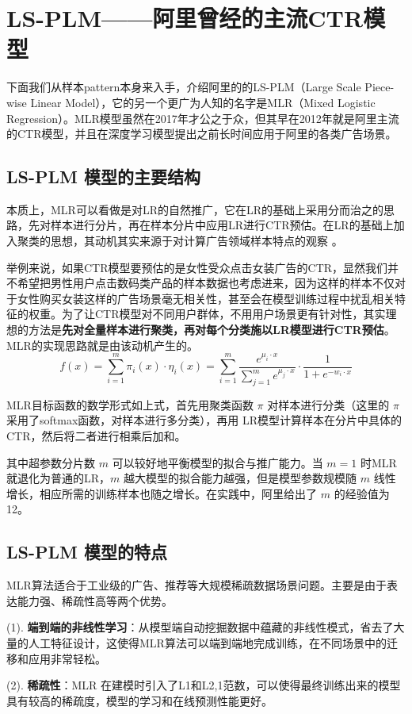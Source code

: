 \documentclass[12pt]{article}
\begin{document}
\section{LS-PLM——阿里曾经的主流CTR模型}
下面我们从样本pattern本身来入手，介绍阿里的的LS-PLM（Large Scale Piece-wise Linear Model），它的另一个更广为人知的名字是MLR（Mixed Logistic Regression）。MLR模型虽然在2017年才公之于众，但其早在2012年就是阿里主流的CTR模型，并且在深度学习模型提出之前长时间应用于阿里的各类广告场景。

\subsection{LS-PLM 模型的主要结构}
本质上，MLR可以看做是对LR的自然推广，它在LR的基础上采用分而治之的思路，先对样本进行分片，再在样本分片中应用LR进行CTR预估。在LR的基础上加入聚类的思想，其动机其实来源于对计算广告领域样本特点的观察 。

举例来说，如果CTR模型要预估的是女性受众点击女装广告的CTR，显然我们并不希望把男性用户点击数码类产品的样本数据也考虑进来，因为这样的样本不仅对于女性购买女装这样的广告场景毫无相关性，甚至会在模型训练过程中扰乱相关特征的权重。为了让CTR模型对不同用户群体，不用用户场景更有针对性，其实理想的方法是\textbf{先对全量样本进行聚类，再对每个分类施以LR模型进行CTR预估}。MLR的实现思路就是由该动机产生的。
$$
f(x) = \sum_{i=1}^m\pi_i(x) \cdot \eta_i(x) = \sum_{i=1}^m \frac{e^{\mu_i \cdot x}}{\sum_{j=1}^m e^{\mu_j\cdot x}} \cdot \frac{1}{1+e^{-w_i\cdot x}}
$$

MLR目标函数的数学形式如上式，首先用聚类函数 $\pi$ 对样本进行分类（这里的 $\pi$ 采用了softmax函数，对样本进行多分类），再用 LR模型计算样本在分片中具体的 CTR，然后将二者进行相乘后加和。

其中超参数分片数 $m$ 可以较好地平衡模型的拟合与推广能力。当 $m=1$ 时MLR就退化为普通的LR，$m$ 越大模型的拟合能力越强，但是模型参数规模随 $m$ 线性增长，相应所需的训练样本也随之增长。在实践中，阿里给出了 $m$ 的经验值为12。

\subsection{LS-PLM 模型的特点}
MLR算法适合于工业级的广告、推荐等大规模稀疏数据场景问题。主要是由于表达能力强、稀疏性高等两个优势。

(1). \textbf{端到端的非线性学习}：从模型端自动挖掘数据中蕴藏的非线性模式，省去了大量的人工特征设计，这使得MLR算法可以端到端地完成训练，在不同场景中的迁移和应用非常轻松。

(2). \textbf{稀疏性}：MLR 在建模时引入了L1和L2,1范数，可以使得最终训练出来的模型具有较高的稀疏度，模型的学习和在线预测性能更好。
\end{document}
